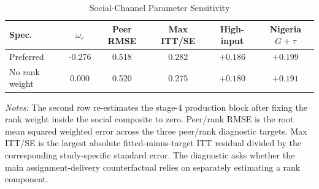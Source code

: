 \begin{table}[H]
\centering
\caption{Social-Channel Parameter Sensitivity}
\label{tab:struct_social_channel_sensitivity}
\begin{threeparttable}
\footnotesize
\begin{tabular}[t]{lccccc}
\toprule
Spec. & $\omega_r$ & Peer RMSE & Max ITT/SE & High-input & Nigeria $G+\tau$ \\
\midrule
Preferred & -0.276 & 0.518 & 0.282 & $+0.186$ & $+0.199$ \\
No rank weight & 0.000 & 0.520 & 0.275 & $+0.180$ & $+0.191$ \\
\bottomrule
\end{tabular}
\begin{tablenotes}
\footnotesize
\item \textit{Notes:} The second row re-estimates the stage-4 production block after fixing the rank weight inside the social composite to zero. Peer/rank RMSE is the root mean squared weighted error across the three peer/rank diagnostic targets. Max ITT/SE is the largest absolute fitted-minus-target ITT residual divided by the corresponding study-specific standard error. The diagnostic asks whether the main assignment-delivery counterfactual relies on separately estimating a rank component.
\end{tablenotes}
\end{threeparttable}
\end{table}
